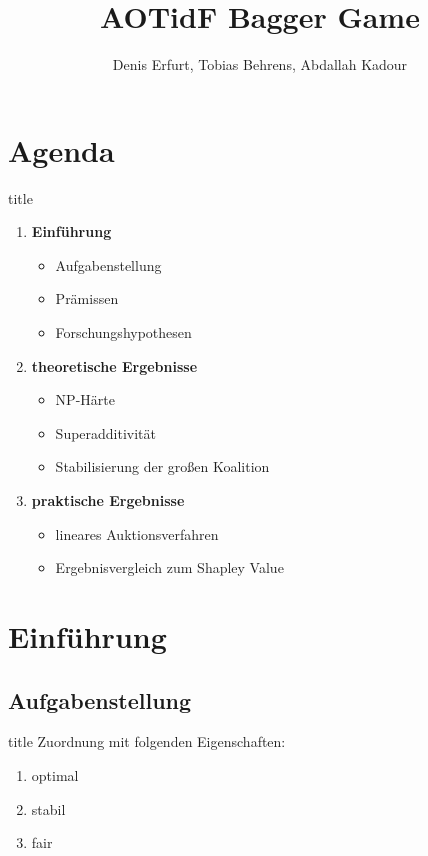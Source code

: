 \documentclass[c]{beamer}
\title[] {AOTidF Bagger Game}
\author[Denis Erfurt, Tobias Behrens, Abdallah Kadour]{Denis Erfurt, Tobias Behrens, Abdallah Kadour}
\theoremstyle{break}
\begin{document}
  \frame{\titlepage} %

  \section*{Agenda}
  \begin{frame}{title} %
    \begin{enumerate}
      \item \textbf{Einführung}
      \begin{itemize}
        \item Aufgabenstellung
        \item Prämissen
        \item Forschungshypothesen
      \end{itemize}
      \item \textbf{theoretische Ergebnisse}
      \begin{itemize}
        \item NP-Härte
        \item Superadditivität
        \item Stabilisierung der großen Koalition
      \end{itemize}
      \item \textbf{praktische Ergebnisse}
      \begin{itemize}
        \item lineares Auktionsverfahren
        \item Ergebnisvergleich zum Shapley Value
      \end{itemize}
    \end{enumerate}
  \end{frame}


  \section*{Einführung}
  \subsection*{Aufgabenstellung}
  \begin{frame}{title} %
    Zuordnung mit folgenden Eigenschaften:
    \begin{enumerate}
      \item optimal
      \item stabil
      \item fair
    \end{enumerate}
  \end{frame}
\end{document}
